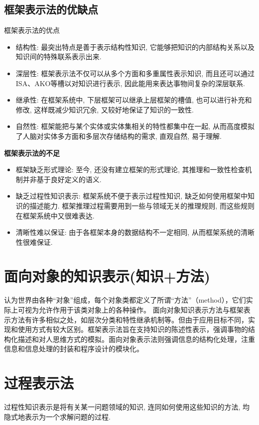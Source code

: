 \subsection{框架表示法的优缺点}
框架表示法的优点
\begin{itemize}
\item 结构性: 最突出特点是善于表示结构性知识, 它能够把知识的内部结构关系以及知识间的特殊联系表示出来.
\item 深层性: 框架表示法不仅可以从多个方面和多重属性表示知识, 而且还可以通过ISA、AKO等槽以对知识进行表示, 因此能用来表达事物间复杂的深层联系.
\item 继承性: 在框架系统中, 下层框架可以继承上层框架的槽值, 也可以进行补充和修改, 这样既减少知识冗余, 又较好地保证了知识的一致性.
\item 自然性: 框架能把与某个实体或实体集相关的特性都集中在一起, 从而高度模拟了人脑对实体多方面和多层次存储结构的需求, 直观自然, 易于理解.
\end{itemize}

\indent\textbf{框架表示法的不足}
\begin{itemize}
\item 框架缺乏形式理论: 至今, 还没有建立框架的形式理论, 其推理和一致性检查机制并非基于良好定义的语义.
\item 缺乏过程性知识表示: 框架系统不便于表示过程性知识, 缺乏如何使用框架中知识的描述能力. 框架推理过程需要用到一些与领域无关的推理规则, 而这些规则在框架系统中又很难表达.
\item 清晰性难以保证: 由于各框架本身的数据结构不一定相同, 从而框架系统的清晰性很难保证.
\end{itemize}
\section{面向对象的知识表示(知识+方法)}
认为世界由各种“对象”组成，每个对象类都定义了所谓“方法”（method），它们实际上可视为允许作用于该类对象上的各种操作。
面向对象知识表示方法与框架表示方法有许多相似之处，如层次分类和特性继承机制等。但由于应用目标不同，实现和使用方式有较大区别。框架表示法旨在支持知识的陈述性表示，强调事物的结构化描述和对人思维方式的模拟。面向对象表示法则强调信息的结构化处理，注重信息和信息处理的封装和程序设计的模块化。
\section{过程表示法}
    过程性知识表示是将有关某一问题领域的知识, 连同如何使用这些知识的方法, 均隐式地表示为一个求解问题的过程.
%
%
%

